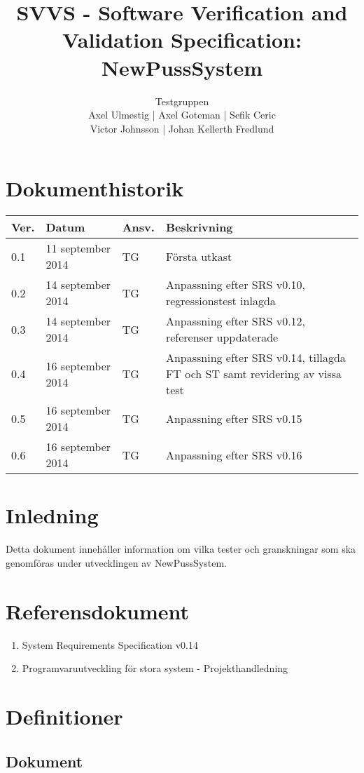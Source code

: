 \documentclass[a4paper]{article}
\title{SVVS - Software Verification and Validation Specification: NewPussSystem}
\author{Testgruppen \\ Axel Ulmestig | Axel Goteman | Sefik Ceric \\ Victor Johnsson | Johan Kellerth Fredlund}
\date{}
\begin{document}
\maketitle
\thispagestyle{fancy}
\tableofcontents
\newpage

\section*{Dokumenthistorik}

\begin{tabular}{ l l l l }
Ver. & Datum & Ansv. & Beskrivning \\\hline
0.1 & 11 september 2014 & TG & Första utkast \\
0.2 & 14 september 2014 & TG & Anpassning efter SRS v0.10, regressionstest inlagda \\
0.3 & 14 september 2014 & TG & Anpassning efter SRS v0.12, referenser uppdaterade\\
0.4 & 16 september 2014 & TG & Anpassning efter SRS v0.14, tillagda FT och ST samt revidering av vissa test\\
0.5 & 16 september 2014 & TG & Anpassning efter SRS v0.15\\
0.6 & 16 september 2014 & TG & Anpassning efter SRS v0.16\\


\end{tabular}
\section{Inledning}       

Detta dokument innehåller information om vilka tester och granskningar som ska genomföras under utvecklingen av NewPussSystem.

\section{Referensdokument}
\begin{enumerate}
\item System Requirements Specification v0.14
\item Programvaruutveckling för stora system - Projekthandledning
\end{enumerate}

\section{Definitioner}

\subsection{Dokument}
\end{document}
